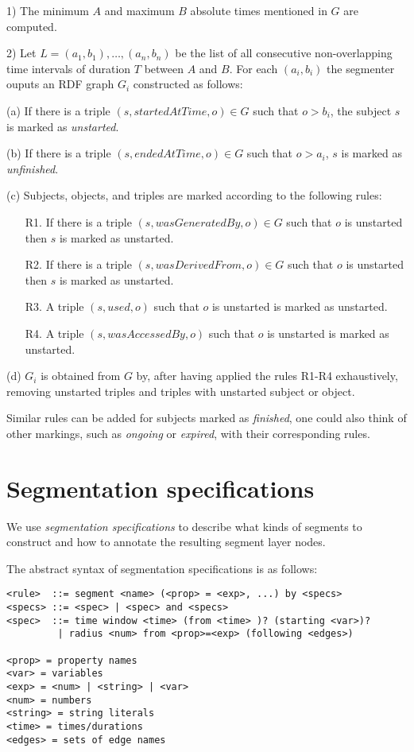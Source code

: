 \documentclass{article}
\begin{document}
1) The minimum $A$ and maximum $B$ absolute times mentioned in $G$ are computed.

2) Let $L = (a_1, b_1), \ldots, (a_n, b_n)$ be the list of all consecutive non-overlapping
time intervals of duration $T$ between $A$ and $B$. For each $(a_i, b_i)$ the segmenter ouputs an RDF graph $G_i$ constructed as follows:

(a) If there is a triple $(s, startedAtTime, o)\in G$ such that $o>b_i$, the subject $s$ is marked as {\em unstarted}.

(b) If there is a triple $(s, endedAtTime, o)\in G$ such that $o>a_i$, $s$ is marked as {\em unfinished}.

(c) Subjects, objects, and triples are marked according to the following rules:
\begin{itemize}
\item[R1.] If there is a triple $(s, wasGeneratedBy, o)\in G$ 
such that $o$ is unstarted then $s$ is marked as unstarted.
\item[R2.] If there is a triple $(s, wasDerivedFrom, o)\in G$ 
such that $o$ is unstarted then $s$ is marked as unstarted.
\item[R3.] A triple $(s, used, o)$ such that $o$ is unstarted is marked as unstarted.
\item[R4.] A triple $(s, wasAccessedBy, o)$ such that $o$ is unstarted is marked as unstarted.
\end{itemize}
(d) $G_i$ is obtained from $G$ by, after having applied the rules R1-R4 exhaustively, 
removing unstarted triples and triples with unstarted subject or object.

Similar rules can be added for subjects marked as {\em finished}, one could also think of 
other markings, such as {\em ongoing} or {\em expired}, with their corresponding rules.

\section{Segmentation specifications}

We use \emph{segmentation specifications} to describe what kinds of
segments to construct and how to annotate the resulting segment layer
nodes.

The abstract syntax of segmentation specifications is as follows:
\begin{verbatim}
<rule>  ::= segment <name> (<prop> = <exp>, ...) by <specs>
<specs> ::= <spec> | <spec> and <specs>
<spec>  ::= time window <time> (from <time> )? (starting <var>)?
         | radius <num> from <prop>=<exp> (following <edges>)
         
<prop> = property names
<var> = variables
<exp> = <num> | <string> | <var>
<num> = numbers
<string> = string literals
<time> = times/durations
<edges> = sets of edge names
\end{verbatim}
\end{document}
